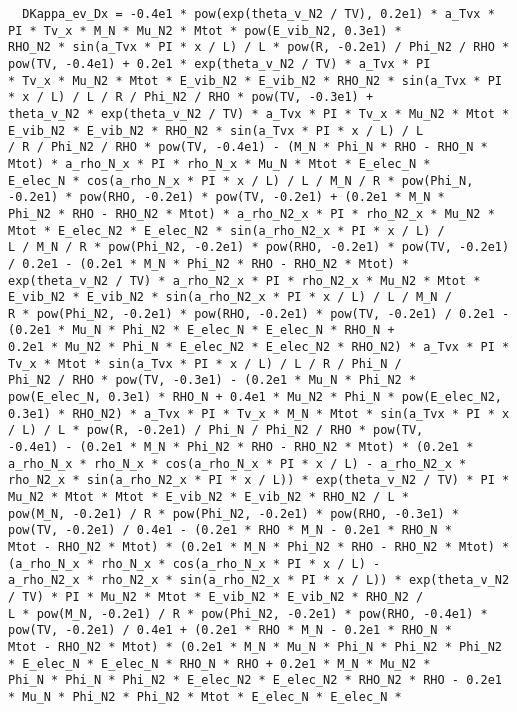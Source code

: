 \documentclass[10pt]{article}
\begin{document}
\begin{scriptsize}
\begin{verbatim}
  DKappa_ev_Dx = -0.4e1 * pow(exp(theta_v_N2 / TV), 0.2e1) * a_Tvx * PI * Tv_x * M_N * Mu_N2 * Mtot * pow(E_vib_N2, 0.3e1) *
RHO_N2 * sin(a_Tvx * PI * x / L) / L * pow(R, -0.2e1) / Phi_N2 / RHO * pow(TV, -0.4e1) + 0.2e1 * exp(theta_v_N2 / TV) * a_Tvx * PI
* Tv_x * Mu_N2 * Mtot * E_vib_N2 * E_vib_N2 * RHO_N2 * sin(a_Tvx * PI * x / L) / L / R / Phi_N2 / RHO * pow(TV, -0.3e1) +
theta_v_N2 * exp(theta_v_N2 / TV) * a_Tvx * PI * Tv_x * Mu_N2 * Mtot * E_vib_N2 * E_vib_N2 * RHO_N2 * sin(a_Tvx * PI * x / L) / L
/ R / Phi_N2 / RHO * pow(TV, -0.4e1) - (M_N * Phi_N * RHO - RHO_N * Mtot) * a_rho_N_x * PI * rho_N_x * Mu_N * Mtot * E_elec_N *
E_elec_N * cos(a_rho_N_x * PI * x / L) / L / M_N / R * pow(Phi_N, -0.2e1) * pow(RHO, -0.2e1) * pow(TV, -0.2e1) + (0.2e1 * M_N *
Phi_N2 * RHO - RHO_N2 * Mtot) * a_rho_N2_x * PI * rho_N2_x * Mu_N2 * Mtot * E_elec_N2 * E_elec_N2 * sin(a_rho_N2_x * PI * x / L) /
L / M_N / R * pow(Phi_N2, -0.2e1) * pow(RHO, -0.2e1) * pow(TV, -0.2e1) / 0.2e1 - (0.2e1 * M_N * Phi_N2 * RHO - RHO_N2 * Mtot) *
exp(theta_v_N2 / TV) * a_rho_N2_x * PI * rho_N2_x * Mu_N2 * Mtot * E_vib_N2 * E_vib_N2 * sin(a_rho_N2_x * PI * x / L) / L / M_N /
R * pow(Phi_N2, -0.2e1) * pow(RHO, -0.2e1) * pow(TV, -0.2e1) / 0.2e1 - (0.2e1 * Mu_N * Phi_N2 * E_elec_N * E_elec_N * RHO_N +
0.2e1 * Mu_N2 * Phi_N * E_elec_N2 * E_elec_N2 * RHO_N2) * a_Tvx * PI * Tv_x * Mtot * sin(a_Tvx * PI * x / L) / L / R / Phi_N /
Phi_N2 / RHO * pow(TV, -0.3e1) - (0.2e1 * Mu_N * Phi_N2 * pow(E_elec_N, 0.3e1) * RHO_N + 0.4e1 * Mu_N2 * Phi_N * pow(E_elec_N2,
0.3e1) * RHO_N2) * a_Tvx * PI * Tv_x * M_N * Mtot * sin(a_Tvx * PI * x / L) / L * pow(R, -0.2e1) / Phi_N / Phi_N2 / RHO * pow(TV,
-0.4e1) - (0.2e1 * M_N * Phi_N2 * RHO - RHO_N2 * Mtot) * (0.2e1 * a_rho_N_x * rho_N_x * cos(a_rho_N_x * PI * x / L) - a_rho_N2_x *
rho_N2_x * sin(a_rho_N2_x * PI * x / L)) * exp(theta_v_N2 / TV) * PI * Mu_N2 * Mtot * Mtot * E_vib_N2 * E_vib_N2 * RHO_N2 / L *
pow(M_N, -0.2e1) / R * pow(Phi_N2, -0.2e1) * pow(RHO, -0.3e1) * pow(TV, -0.2e1) / 0.4e1 - (0.2e1 * RHO * M_N - 0.2e1 * RHO_N *
Mtot - RHO_N2 * Mtot) * (0.2e1 * M_N * Phi_N2 * RHO - RHO_N2 * Mtot) * (a_rho_N_x * rho_N_x * cos(a_rho_N_x * PI * x / L) -
a_rho_N2_x * rho_N2_x * sin(a_rho_N2_x * PI * x / L)) * exp(theta_v_N2 / TV) * PI * Mu_N2 * Mtot * E_vib_N2 * E_vib_N2 * RHO_N2 /
L * pow(M_N, -0.2e1) / R * pow(Phi_N2, -0.2e1) * pow(RHO, -0.4e1) * pow(TV, -0.2e1) / 0.4e1 + (0.2e1 * RHO * M_N - 0.2e1 * RHO_N *
Mtot - RHO_N2 * Mtot) * (0.2e1 * M_N * Mu_N * Phi_N * Phi_N2 * Phi_N2 * E_elec_N * E_elec_N * RHO_N * RHO + 0.2e1 * M_N * Mu_N2 *
Phi_N * Phi_N * Phi_N2 * E_elec_N2 * E_elec_N2 * RHO_N2 * RHO - 0.2e1 * Mu_N * Phi_N2 * Phi_N2 * Mtot * E_elec_N * E_elec_N *

\end{verbatim}
\end{scriptsize}
\end{document}
